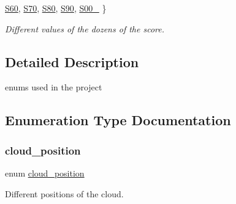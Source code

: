\begin{DoxyCompactItemize}
\hyperlink{group__types_ggabd8d88ed6ba2aef17eb45496d20be732a5b93c5f1015f09ecbd7df1f9f1483a67}{S60}, 
\hyperlink{group__types_ggabd8d88ed6ba2aef17eb45496d20be732ab85dcfb6949f28b408c5f2e4f506600b}{S70}, 
\hyperlink{group__types_ggabd8d88ed6ba2aef17eb45496d20be732a2ff02f020e666eac0b7e8ebf42914699}{S80}, 
\newline
\hyperlink{group__types_ggabd8d88ed6ba2aef17eb45496d20be732a8be8961f080a6bd10e376b317568a8e7}{S90}, 
\hyperlink{group__types_ggabd8d88ed6ba2aef17eb45496d20be732ab6c8e8fcf6bbc26a25590c229899f940}{S00\+\_}
 \}\begin{DoxyCompactList}\small\item\em Different values of the dozens of the score. \end{DoxyCompactList}
\end{DoxyCompactItemize}


\subsection{Detailed Description}
enums used in the project 

\subsection{Enumeration Type Documentation}
\mbox{\label{group__types_ga7e8dce2e0fc3ad3b4e20b07886fa11d6}} 
\subsubsection{\texorpdfstring{cloud\+\_\+position}{cloud\_position}}
{\footnotesize\ttfamily enum \hyperlink{group__types_ga7e8dce2e0fc3ad3b4e20b07886fa11d6}{cloud\+\_\+position}}



Different positions of the cloud. 

